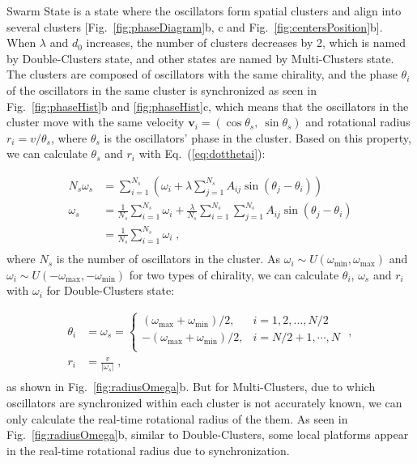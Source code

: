 \documentclass[%
 aip,
 amsmath,amssymb,
 reprint,%
]{revtex4-1}
\begin{document}
Swarm State is a state where the oscillators form spatial clusters and align into several clusters [Fig.~\ref{fig:phaseDiagram}b, c and Fig.~\ref{fig:centersPosition}b]. When $\lambda$ and $d_0$ increases, the number of clusters decreases by 2, which is named by Double-Clusters state, and other states are named by Multi-Clusters state. The clusters are composed of oscillators with the same chirality, and the phase $\theta_i$ of the oscillators in the same cluster is synchronized as seen in Fig.~\ref{fig:phaseHist}b and \ref{fig:phaseHist}c, which means that the oscillators in the cluster move with the same velocity $\mathbf{v}_i=\left( \cos \theta _s,\ \sin \theta _s \right)$ and rotational radius $r_i=v/\theta_s$, where $\theta_s$ is the oscillators' phase in the cluster. Based on this property, we can calculate $\theta_s$ and $r_i$ with Eq.~(\ref{eq:dotthetai}):

\begin{equation}\label{eq:clusterState}
    \begin{aligned}
        N_s\omega _s&=\sum_{i=1}^{N_s}{\left( \omega _i+\lambda \sum_{j=1}^{N_s}{A_{ij}\sin \left( \theta _j-\theta _i \right)} \right)}\\
        \omega _s&=\frac{1}{N_s}\sum_{i=1}^{N_s}{\omega _i}+\frac{\lambda}{N_s}\sum_{i=1}^{N_s}{\sum_{j=1}^{N_s}{A_{ij}\sin \left( \theta _j-\theta _i \right)}}\\
        &=\frac{1}{N_s}\sum_{i=1}^{N_s}{\omega _i}\;,\\
    \end{aligned}
\end{equation}
where $N_s$ is the number of oscillators in the cluster.
As $\omega_i \sim U\left( \omega _{\min},\omega _{\max} \right)$ and $\omega_i \sim U\left( -\omega _{\max},-\omega _{\min} \right)$ for two types of chirality, we can calculate $\theta_i$, $\omega_s$ and $r_i$ with $\omega_i$ for Double-Clusters state:

\begin{equation}
    \begin{aligned}\label{eq:clusterState2}
        \theta _i&=\omega _s=\begin{cases}
        \left( \omega _{\max}+\omega _{\min} \right) /2,&		i=1,2,\dots ,N/2\\
        -\left( \omega _{\max}+\omega _{\min} \right) /2,&		i=N/2+1,\cdots ,N\\
    \end{cases}\,\,,\\
        r_i&=\frac{v}{\left|\omega _s\right|}\;,\\
    \end{aligned}
\end{equation}
as shown in Fig.~\ref{fig:radiusOmega}b. But for Multi-Clusters, due to which oscillators are synchronized within each cluster is not accurately known, we can only calculate the real-time rotational radius of the them. As seen in Fig.~\ref{fig:radiusOmega}b, similar to Double-Clusters, some local platforms appear in the real-time rotational radius due to synchronization.
\end{document}
